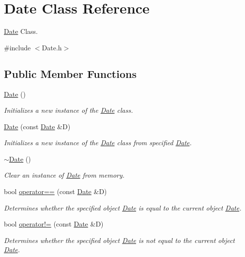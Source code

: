 \hypertarget{class_date}{\section{Date Class Reference}
\label{class_date}
}


\hyperlink{class_date}{Date} Class.  




{\ttfamily \#include $<$Date.\-h$>$}

\subsection*{Public Member Functions}
\begin{DoxyCompactItemize}
\item 
\hyperlink{class_date_a4e59ed4ba66eec61c27460c5d09fa1bd}{Date} ()
\begin{DoxyCompactList}\small\item\em Initializes a new instance of the \hyperlink{class_date}{Date} class. \end{DoxyCompactList}\item 
\hyperlink{class_date_aae885dc98ddd667b560ded3c8ae65ccb}{Date} (const \hyperlink{class_date}{Date} \&D)
\begin{DoxyCompactList}\small\item\em Initializes a new instance of the \hyperlink{class_date}{Date} class from specified \hyperlink{class_date}{Date}. \end{DoxyCompactList}\item 
\hyperlink{class_date_ade4b469433b7966cc034cbcc6799233b}{$\sim$\-Date} ()
\begin{DoxyCompactList}\small\item\em Clear an instance of \hyperlink{class_date}{Date} from memory. \end{DoxyCompactList}\item 
bool \hyperlink{class_date_adfb778e1afee2312a53597275e669ad6}{operator==} (const \hyperlink{class_date}{Date} \&D)
\begin{DoxyCompactList}\small\item\em Determines whether the specified object \hyperlink{class_date}{Date} is equal to the current object \hyperlink{class_date}{Date}. \end{DoxyCompactList}\item 
bool \hyperlink{class_date_ae6e05500234df3028aace397f68b0929}{operator!=} (const \hyperlink{class_date}{Date} \&D)
\begin{DoxyCompactList}\small\item\em Determines whether the specified object \hyperlink{class_date}{Date} is not equal to the current object \hyperlink{class_date}{Date}. \end{DoxyCompactList}\item 

\end{DoxyCompactItemize}
